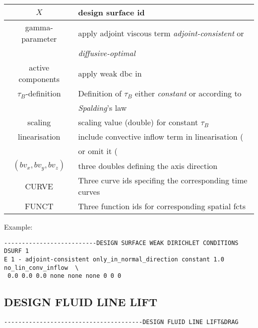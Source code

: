 \begin{center}
\begin{tabular}{c||l}
$X$                           & design surface id             \\ \hline
gamma-parameter               & apply adjoint viscous term \emph{adjoint-consistent} or \\
                              & \emph{diffusive-optimal}       \\ \hline
active components             & apply weak dbc in \verb1all_directions1 or only 
                                \verb1only_in_normal_direction1 \\ \hline
$\tau_B$-definition           & Definition of $\tau_B$ either \emph{constant} or according to \\
                              & \emph{Spalding}'s law \\ \hline
scaling                       & scaling value (double) for constant $\tau_B$ \\\hline
linearisation                 & include convective inflow term in linearisation (\verb1lin_all1)\\
                              &  or omit it (\verb1no_lin_conv_inflow1)\\\hline
$\left(bv_x,bv_y,bv_z\right)$ & three doubles defining the axis direction \\\hline
CURVE                         & Three curve ids specifing the corresponding time curves \\ \hline
FUNCT                         & Three function ids for corresponding spatial fcts \\ 
\end{tabular}
\end{center}

Example:

\begin{verbatim}
--------------------------DESIGN SURFACE WEAK DIRICHLET CONDITIONS
DSURF 1
E 1 - adjoint-consistent only_in_normal_direction constant 1.0 no_lin_conv_inflow  \
 0.0 0.0 0.0 none none none 0 0 0     
\end{verbatim}

\subsection{DESIGN FLUID LINE LIFT}
\begin{verbatim}
---------------------------------------DESIGN FLUID LINE LIFT&DRAG
\end{verbatim}

